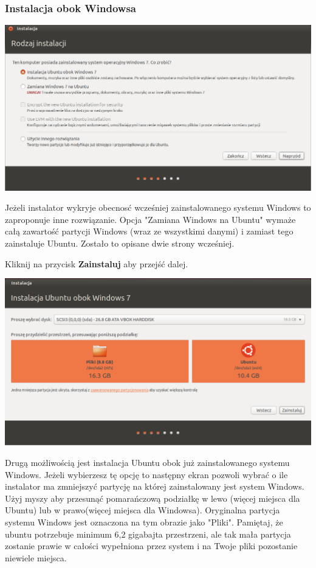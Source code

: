 \subsubsection{Instalacja obok Windowsa}
\begin{center}
	\includegraphics[scale=0.5]{images/instalator_partycjonowanie_obok_wondows7.png}
\end{center}
Jeżeli instalator wykryje obecnosć wcześniej zainstalowanego systemu Windows to zaproponuje inne rozwiązanie. Opcja "Zamiana Windows na Ubuntu" wymaże całą zawartość partycji Windows (wraz ze wszystkimi danymi) i zamiast tego zainstaluje Ubuntu. Zostało to opisane dwie strony wcześniej.
\begin{flushright}
Kliknij na przycisk \textbf{Zainstaluj} aby przejść dalej.
\end{flushright}
\clearpage
\begin{center}
	\includegraphics[scale=0.5]{images/instalator_partycjonowanie_obok_wondows7_2.png}
\end{center}
Drugą możliwością jest instalacja Ubuntu obok już zainstalowanego systemu Windows. Jeżeli wybierzesz tę opcję to następny ekran pozwoli wybrać o ile instalator ma zmniejszyć partycję na której zainstalowany jest system Windows. Użyj myszy aby przesunąć pomarańczową podziałkę w lewo (więcej miejsca dla Ubuntu) lub w prawo(więcej miejsca dla Windowsa). Oryginalna partycja systemu Windows jest oznaczona na tym obrazie jako "Pliki". Pamiętaj, że ubuntu potrzebuje minimum 6,2 gigabajta przestrzeni, ale tak mała partycja zostanie prawie w całości wypełniona przez system i na Twoje pliki pozostanie niewiele miejsca.

